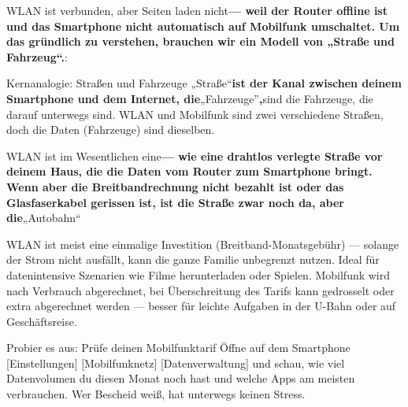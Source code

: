 


WLAN ist verbunden, aber Seiten laden nicht\textbf{— weil der Router offline ist und das Smartphone nicht automatisch auf Mobilfunk umschaltet. Um das gründlich zu verstehen, brauchen wir ein Modell von „Straße und Fahrzeug“.}:

\begin{tcbinfo}{Kernanalogie: Straßen und Fahrzeuge}
„Straße“\textbf{ist der Kanal zwischen deinem Smartphone und dem Internet, die}„Fahrzeuge”\textbf{,}sind die Fahrzeuge, die darauf unterwegs sind. WLAN und Mobilfunk sind zwei verschiedene Straßen, doch die Daten (Fahrzeuge) sind dieselben.

\end{tcbinfo}

\booksubsection{,}

WLAN ist im Wesentlichen eine\textbf{— wie eine drahtlos verlegte Straße vor deinem Haus, die die Daten vom Router zum Smartphone bringt. Wenn aber die Breitbandrechnung nicht bezahlt ist oder das Glasfaserkabel gerissen ist, ist die Straße zwar noch da, aber die}„Autobahn“


WLAN ist meist eine einmalige Investition (Breitband-Monatsgebühr) — solange der Strom nicht ausfällt, kann die ganze Familie unbegrenzt nutzen. Ideal für datenintensive Szenarien wie Filme herunterladen oder Spielen. Mobilfunk wird nach Verbrauch abgerechnet, bei Überschreitung des Tarifs kann gedrosselt oder extra abgerechnet werden — besser für leichte Aufgaben in der U-Bahn oder auf Geschäftsreise.

\begin{tcbpractice}{Probier es aus: Prüfe deinen Mobilfunktarif}
Öffne auf dem Smartphone [Einstellungen] [Mobilfunknetz] [Datenverwaltung] und schau, wie viel Datenvolumen du diesen Monat noch hast und welche Apps am meisten verbrauchen. Wer Bescheid weiß, hat unterwegs keinen Stress.

\end{tcbpractice}


